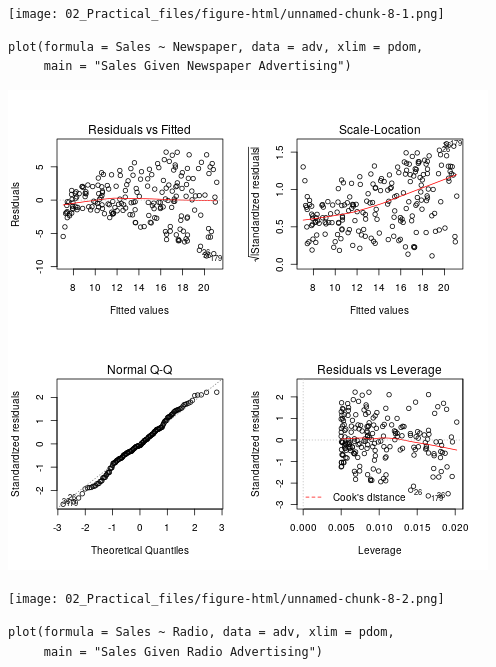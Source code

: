 \documentclass[11pt]{article}
\begin{document}
\begin{enumerate}
\begin{center}
\texttt{[image: 02\_Practical\_files/figure-html/unnamed-chunk-8-1.png]}
\end{center}

\begin{verbatim}
plot(formula = Sales ~ Newspaper, data = adv, xlim = pdom,
     main = "Sales Given Newspaper Advertising")
\end{verbatim}

\begin{center}
\includegraphics[width=.9\linewidth]{Intro02AdvPlotLinMod.png}
\end{center}

\begin{center}
\texttt{[image: 02\_Practical\_files/figure-html/unnamed-chunk-8-2.png]}
\end{center}

\begin{verbatim}
plot(formula = Sales ~ Radio, data = adv, xlim = pdom,
     main = "Sales Given Radio Advertising")
\end{verbatim}


\end{enumerate}
\end{document}
